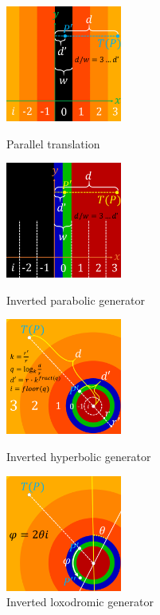 \begin{figure}[h!tbp]
 \begin{minipage}[t]{0.24\hsize}
  \center
  \includegraphics[width=1.5in, height=1.5in, keepaspectratio]{../img/klein/2diis/translationModTP.pdf}
  \caption{Parallel translation}
  \label{fig:translationMod}
 \end{minipage}
 \hspace*{\fill}
 \begin{minipage}[t]{0.24\hsize}
  \center
  \includegraphics[width=1.5in, height=1.5in, keepaspectratio]{../img/klein/2diis/parabolicModTP.pdf}
  \caption{Inverted parabolic generator}
  \label{fig:parabolicMod}
 \end{minipage}
 \hspace*{\fill}
 \begin{minipage}[t]{0.24\hsize}
  \center
  \includegraphics[width=1.5in, height=1.5in, keepaspectratio]{../img/klein/2diis/hyperbolicMod.pdf}
  \caption{Inverted hyperbolic generator}
  \label{fig:hyperbolicMod}
 \end{minipage}
 \hspace*{\fill}
 \begin{minipage}[t]{0.24\hsize}
  \center
  \includegraphics[width=1.5in, height=1.5in, keepaspectratio]{../img/klein/2diis/loxodromicModRotation.pdf}
  \caption{Inverted loxodromic generator}
  \label{fig:loxodromicMod}
  \hspace*{\fill}
 \end{minipage}
\end{figure}


